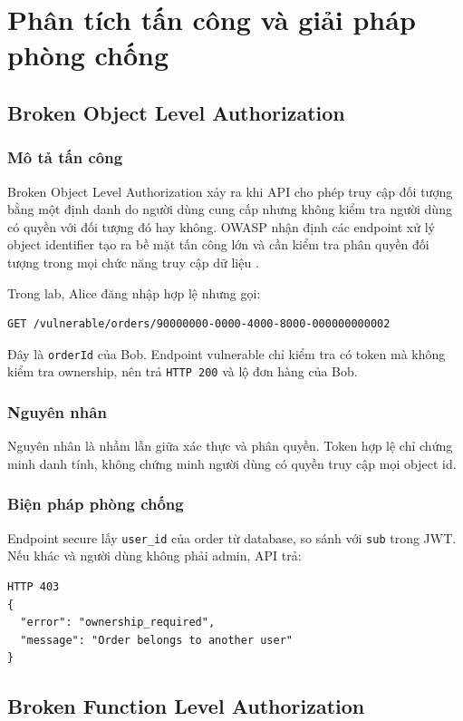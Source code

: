\documentclass[14pt,a4paper]{extreport}
\begin{document}
\chapter{Phân tích tấn công và giải pháp phòng chống}

\section{Broken Object Level Authorization}
\subsection{Mô tả tấn công}
Broken Object Level Authorization xảy ra khi API cho phép truy cập đối tượng bằng một định danh do người dùng cung cấp nhưng không kiểm tra người dùng có quyền với đối tượng đó hay không. OWASP nhận định các endpoint xử lý object identifier tạo ra bề mặt tấn công lớn và cần kiểm tra phân quyền đối tượng trong mọi chức năng truy cập dữ liệu \cite{owaspbola}.

Trong lab, Alice đăng nhập hợp lệ nhưng gọi:
\begin{lstlisting}
GET /vulnerable/orders/90000000-0000-4000-8000-000000000002
\end{lstlisting}
Đây là \texttt{orderId} của Bob. Endpoint vulnerable chỉ kiểm tra có token mà không kiểm tra ownership, nên trả \texttt{HTTP 200} và lộ đơn hàng của Bob.

\subsection{Nguyên nhân}
Nguyên nhân là nhầm lẫn giữa xác thực và phân quyền. Token hợp lệ chỉ chứng minh danh tính, không chứng minh người dùng có quyền truy cập mọi object id.

\subsection{Biện pháp phòng chống}
Endpoint secure lấy \texttt{user\_id} của order từ database, so sánh với \texttt{sub} trong JWT. Nếu khác và người dùng không phải admin, API trả:
\begin{lstlisting}
HTTP 403
{
  "error": "ownership_required",
  "message": "Order belongs to another user"
}
\end{lstlisting}

\section{Broken Function Level Authorization}
\end{document}
